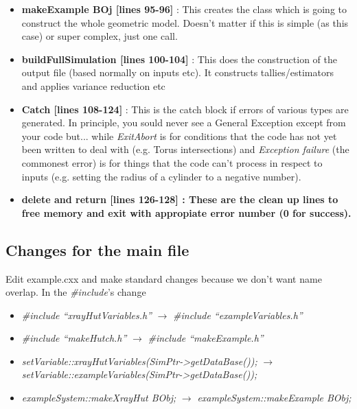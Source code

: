 \begin{itemize}
\item{{\bf makeExample BOj [lines 95-96]} :
  This creates the class which is going to construct the whole geometric
  model. Doesn't matter if this is simple (as this case) or super complex,
  just one call. }

\item{{\bf buildFullSimulation [lines 100-104]} :
  This does the construction of the output file (based normally on inputs
  etc). It constructs tallies/estimators and applies variance reduction etc }

\item{{\bf Catch [lines 108-124]} : This is the catch block if errors
  of various types are generated. In principle, you sould never see a
  General Exception except from your code but... while {\it ExitAbort} is
  for conditions that the code has not yet been written to deal with
  (e.g. Torus intersections) and {\it Exception failure} (the commonest error)
  is for things that the code can't process in respect to inputs
  (e.g. setting the radius of a cylinder to a negative number).
  }

\item{{\bf delete and return [lines 126-128] :
    These are the clean up lines to free memory and exit with appropiate
    error number (0 for success).}
}
  
\end{itemize}
  


\subsection{Changes for the main file}

Edit example.cxx and make standard changes because we don't want name overlap.
In the {\it \#include}'s change

\begin{itemize}
\item{
  {\it \#include ``xrayHutVariables.h''}
  $\rightarrow$
  {\it \#include ``exampleVariables.h''}
}

\item{
  {\it \#include ``makeHutch.h''}
  $\rightarrow$
  {\it \#include ``makeExample.h''}
}

\item{
  {\it setVariable::xrayHutVariables(SimPtr->getDataBase());}
  $\rightarrow$
  {\it setVariable::exampleVariables(SimPtr->getDataBase());}
}

\item{
  {\it  exampleSystem::makeXrayHut BObj; }
  $\rightarrow$
  {\it  exampleSystem::makeExample BObj; }
}

\end{itemize}

